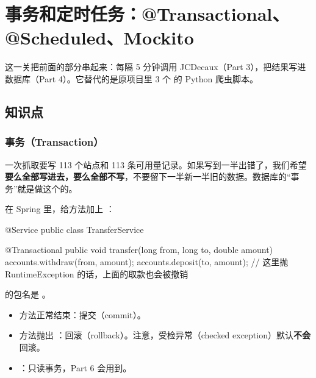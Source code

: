 \chapter{事务和定时任务：@Transactional、@Scheduled、Mockito}

这一关把前面的部分串起来：每隔 5 分钟调用 JCDecaux（Part 3），把结果写进数据库（Part 4）。它替代的是原项目里 3 个  的 Python 爬虫脚本。


\section{知识点}

\subsection{事务（Transaction）}

一次抓取要写 113 个站点和 113 条可用量记录。如果写到一半出错了，我们希望\textbf{要么全部写进去，要么全部不写}，不要留下一半新一半旧的数据。数据库的“事务”就是做这个的。

在 Spring 里，给方法加上 ：

\begin{java}
@Service
public class TransferService {

    @Transactional
    public void transfer(long from, long to, double amount) {
        accounts.withdraw(from, amount);
        accounts.deposit(to, amount);  // 这里抛 RuntimeException 的话，上面的取款也会被撤销
    }
}
\end{java}

 的包名是 。

\begin{itemize}
  \item 方法正常结束：提交（commit）。
  \item 方法抛出 ：回滚（rollback）。注意，受检异常（checked exception）默认\textbf{不会}回滚。
  \item {}：只读事务，Part 6 会用到。
\end{itemize}

